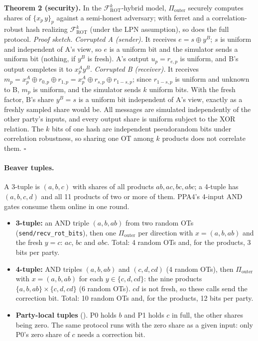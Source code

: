 \textbf{Theorem 2 (security).} In the $\mathcal{F}^{k}_{\mathrm{ROT}}$-hybrid model, $\Pi_{\mathrm{outer}}$ securely
computes shares of $\{x_p\,y\}_p$ against a semi-honest adversary; with ferret and a correlation-robust hash
realizing $\mathcal{F}^{k}_{\mathrm{ROT}}$ (under the LPN assumption), so does the full protocol.
\emph{Proof sketch.} \emph{Corrupted A (sender).} It receives $e = s \oplus y^B$; $s$ is uniform and independent of A's
view, so $e$ is a uniform bit and the simulator sends a uniform bit (nothing, if $y^B$ is fresh). A's output
$u_p = r_{e,p}$ is uniform, and B's output completes it to $x^A_p y^B$. \emph{Corrupted B (receiver).} It receives
$m_p = x^A_p \oplus r_{0,p} \oplus r_{1,p} = x^A_p \oplus r_{s,p} \oplus r_{1-s,p}$; since $r_{1-s,p}$ is uniform and
unknown to B, $m_p$ is uniform, and the simulator sends $k$ uniform bits. With the fresh factor, B's share
$y^B = s$ is a uniform bit independent of A's view, exactly as a freshly sampled share would be. All messages are
simulated independently of the other party's inputs, and every output share is uniform subject to the XOR relation.
The $k$ bits of one hash are independent pseudorandom bits under correlation robustness, so sharing one OT among
$k$ products does not correlate them. \hfill$\square$

\paragraph{Beaver tuples.} A 3-tuple is $(a, b, c)$ with shares of all products $ab, ac, bc, abc$; a 4-tuple has
$(a, b, c, d)$ and all 11 products of two or more of them. PPA4's 4-input AND gates consume them online in one round.
\begin{itemize}\itemsep1pt
\item \textbf{3-tuple:} an AND triple $(a, b, ab)$ from two random OTs (\texttt{send/recv\_rot\_bits}), then one
  $\Pi_{\mathrm{outer}}$ per direction with $x = (a, b, ab)$ and the fresh $y = c$: $ac$, $bc$ and $abc$. Total: 4 random
  OTs and, for the products, 3 bits per party.
\item \textbf{4-tuple:} AND triples $(a, b, ab)$ and $(c, d, cd)$ (4 random OTs), then $\Pi_{\mathrm{outer}}$ with
  $x = (a, b, ab)$ for each $y \in \{c, d, cd\}$: the nine products $\{a, b, ab\} \times \{c, d, cd\}$ (6 random OTs).
  $cd$ is not fresh, so these calls send the correction bit. Total: 10 random OTs and, for the products, 12 bits
  per party.
\item \textbf{Party-local tuples} (). P0 holds $b$ and P1 holds $c$ in full, the other shares
  being zero. The same protocol runs with the zero share as a given input: only P0's zero share of $c$ needs a
  correction bit.
\end{itemize}

